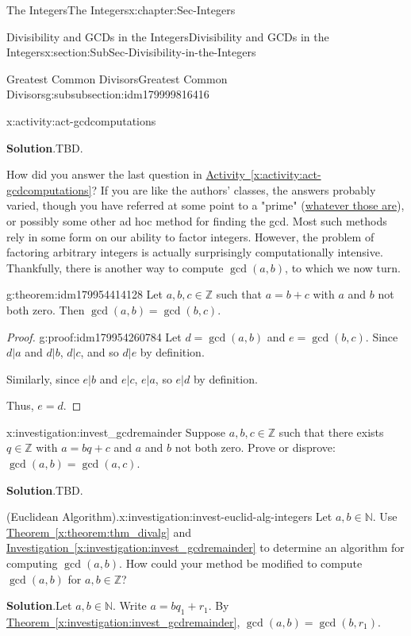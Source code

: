 \documentclass[oneside,10pt,]{book}
\newcommand{\blocktitlefont}{\relax}
\newcommand{\xreffont}{\relax}
\numberwithin{equation}{section}
\def\Z{{\mathbb Z}}
\def\N{{\mathbb N}}
\begin{document}
\begin{chapterptx}{The Integers}{}{The Integers}{}{}{x:chapter:Sec-Integers}
\begin{sectionptx}{Divisibility and GCDs in the Integers}{}{Divisibility and GCDs in the Integers}{}{}{x:section:SubSec-Divisibility-in-the-Integers}
\begin{subsubsectionptx}{Greatest Common Divisors}{}{Greatest Common Divisors}{}{}{g:subsubsection:idm179999816416}
\begin{activity}{}{x:activity:act-gcdcomputations}
\par\smallskip%
\noindent\textbf{\blocktitlefont Solution}.\hypertarget{g:solution:idm179954423792}{}\quad{}TBD.%
\end{activity}
How did you answer the last question in \hyperref[x:activity:act-gcdcomputations]{Activity~{\xreffont\ref{x:activity:act-gcdcomputations}}}? If you are like the authors' classes, the answers probably varied, though you have referred at some point to a "prime" (\hyperref[x:definition:def-primeinteger]{whatever those are}), or possibly some other ad hoc method for finding the gcd. Most such methods rely in some form on our ability to factor integers. However, the problem of factoring arbitrary integers is actually surprisingly computationally intensive. Thankfully, there is another way to compute \(\gcd(a,b)\), to which we now turn.%
\begin{theorem}{}{}{g:theorem:idm179954414128}%
Let \(a,b,c\in\Z\) such that \(a = b+c\) with \(a\) and \(b\) not both zero. Then \(\gcd(a,b) = \gcd(b,c)\).%
\end{theorem}
\begin{proof}{}{g:proof:idm179954260784}
Let \(d = \gcd(a,b)\) and \(e = \gcd(b,c)\). Since \(d|a\) and \(d|b\), \(d|c\), and so \(d|e\) by definition.%
\par
Similarly, since \(e|b\) and \(e|c\), \(e|a\), so \(e|d\) by definition.%
\par
Thus, \(e = d\).%
\end{proof}
\begin{investigation}{}{x:investigation:invest_gcdremainder}%
Suppose \(a,b,c\in\Z\) such that there exists \(q\in\Z\) with \(a = bq + c\) and \(a\) and \(b\) not both zero. Prove or disprove: \(\gcd(a,b)=\gcd(a,c)\).%
\par\smallskip%
\noindent\textbf{\blocktitlefont Solution}.\hypertarget{g:solution:idm180000080416}{}\quad{}TBD.\end{investigation}
\begin{investigation}{(Euclidean Algorithm).}{x:investigation:invest-euclid-alg-integers}%
Let \(a,b\in \N\). Use \hyperref[x:theorem:thm_divalg]{Theorem~{\xreffont\ref{x:theorem:thm_divalg}}} and \hyperref[x:investigation:invest_gcdremainder]{Investigation~{\xreffont\ref{x:investigation:invest_gcdremainder}}} to determine an algorithm for computing \(\gcd(a,b)\). How could your method be modified to compute \(\gcd(a,b)\) for \(a,b\in\Z\)?%
\par\smallskip%
\noindent\textbf{\blocktitlefont Solution}.\hypertarget{g:solution:idm179999568880}{}\quad{}Let \(a,b\in \N\). Write \(a = bq_1+r_1\). By \hyperref[x:investigation:invest_gcdremainder]{Theorem~{\xreffont\ref{x:investigation:invest_gcdremainder}}}, \(\gcd(a,b) = \gcd(b,r_1)\).%

\end{investigation}
\end{subsubsectionptx}
\end{sectionptx}
\end{chapterptx}
\end{document}
